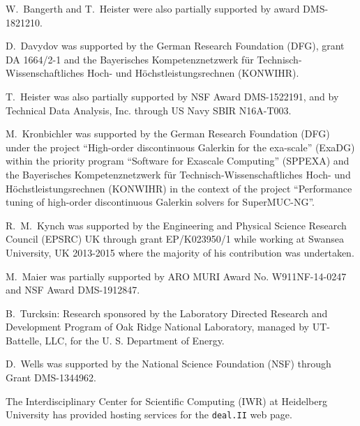 \documentclass{ansarticle-preprint}
\newcommand{\specialword}[1]{\texttt{#1}}
\newcommand{\dealii}{{\specialword{deal.II}}\xspace}
\begin{document}
W.~Bangerth and T.~Heister were also partially supported by award DMS-1821210.

D.~Davydov was supported by the German Research Foundation (DFG), grant DA
1664/2-1 and the Bayerisches Kompetenznetzwerk
f\"ur Technisch-Wissenschaftliches Hoch- und H\"ochstleistungsrechnen
(KONWIHR).

T.~Heister was also partially supported by NSF Award DMS-1522191, and
by Technical Data Analysis, Inc. through US Navy SBIR N16A-T003.

M.~Kronbichler was supported by the German
Research Foundation (DFG) under the project ``High-order discontinuous
Galerkin for the exa-scale'' (\mbox{ExaDG}) within the priority program ``Software
for Exascale Computing'' (SPPEXA) and the Bayerisches Kompetenznetzwerk
f\"ur Technisch-Wissen\-schaft\-li\-ches Hoch- und H\"ochstleistungsrechnen
(KONWIHR) in the context of the project
``Performance tuning of high-order discontinuous Galerkin solvers for
SuperMUC-NG''.

R.~M.~Kynch was supported by the Engineering and Physical Science Research
Council (EPSRC) UK through grant EP/K023950/1 while working at Swansea
University, UK 2013-2015 where the majority of his contribution was
undertaken.

M.~Maier was partially supported by ARO MURI Award No. W911NF-14-0247 and
NSF Award DMS-1912847.

B.~Turcksin: Research sponsored by the Laboratory Directed Research and
Development Program of Oak Ridge National Laboratory, managed by UT-Battelle,
LLC, for the U. S. Department of Energy.

D.~Wells was supported by the National Science Foundation (NSF) through Grant
DMS-1344962.

The Interdisciplinary Center for Scientific Computing (IWR) at Heidelberg
University has provided hosting services for the \dealii web page.


{}

\end{document}
